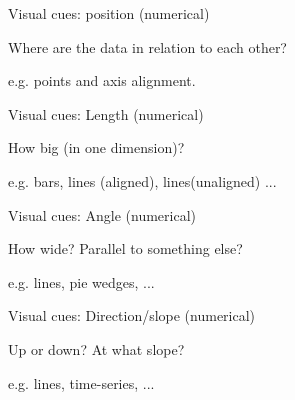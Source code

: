 \documentclass[table]{beamer}\usepackage[]{graphicx}\usepackage[]{xcolor}
\begin{document}

\begin{frame}[fragile]{Visual cues: position (numerical)}

\begin{block}{Where are the data in relation to each other?}

e.g. points and axis alignment.
\end{block}

\vspace{15em}

\end{frame}


\begin{frame}[fragile]{Visual cues: Length (numerical)}

\begin{block}{How big (in one dimension)?}

e.g. bars, lines (aligned), lines(unaligned) ...

\end{block}

\vspace{15em}

\end{frame}



\begin{frame}[fragile]{Visual cues: Angle (numerical)}

\begin{block}{How wide? Parallel to something else?}

e.g. lines, pie wedges, ...

\end{block}

\vspace{15em}

\end{frame}


\begin{frame}[fragile]{Visual cues: Direction/slope (numerical)}

\begin{block}{Up or down? At what slope?}

e.g. lines, time-series, ...

\end{block}

\vspace{15em}

\end{frame}
\end{document}
